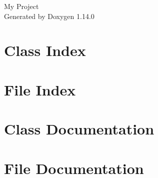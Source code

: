 \documentclass[twoside]{book}
\newcommand{\+}{\discretionary{\mbox{\scriptsize$\hookleftarrow$}}{}{}}
\newcommand{\clearemptydoublepage}{%
    \newpage{\pagestyle{empty}\cleardoublepage}%
  }
\begin{document}
  \raggedbottom
    \hypersetup{pageanchor=false,
                bookmarksnumbered=true,
                pdfencoding=unicode
               }
  \begin{titlepage}
  \vspace*{7cm}
  \begin{center}%
  {\Large My Project}\\
  \vspace*{1cm}
  {\large Generated by Doxygen 1.14.0}\\
  \end{center}
  \end{titlepage}
  \clearemptydoublepage
  \tableofcontents
  \clearemptydoublepage
  \hypersetup{pageanchor=true}
\chapter{Class Index}

\chapter{File Index}

\chapter{Class Documentation}














\chapter{File Documentation}



























  \backmatter
  \newpage
  \clearemptydoublepage
  \printindex
\end{document}
